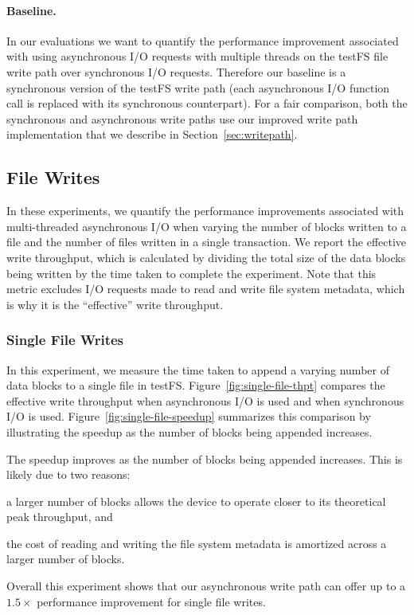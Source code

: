 \paragraph{Baseline.}
In our evaluations we want to quantify the performance improvement associated
with using asynchronous I/O requests with multiple threads on the testFS file
write path over synchronous I/O requests. Therefore our baseline is a
synchronous version of the testFS write path (each asynchronous I/O function
call is replaced with its synchronous counterpart). For a fair comparison, both
the synchronous and asynchronous write paths use our improved write path
implementation that we describe in Section~\ref{sec:writepath}.

\subsection{File Writes}
In these experiments, we quantify the performance improvements associated with
multi-threaded asynchronous I/O when varying the number of blocks written to a
file and the number of files written in a single transaction. We report the
effective write throughput, which is calculated by dividing the total size of
the data blocks being written by the time taken to complete the experiment.
Note that this metric excludes I/O requests made to read and write file system
metadata, which is why it is the ``effective'' write throughput.

\subsubsection{Single File Writes}
In this experiment, we measure the time taken to append a varying number of
data blocks to a single file in testFS. Figure~\ref{fig:single-file-thpt}
compares the effective write throughput when asynchronous I/O is used and when
synchronous I/O is used. Figure~\ref{fig:single-file-speedup} summarizes this
comparison by illustrating the speedup as the number of blocks being appended
increases.

The speedup improves as the number of blocks being appended increases. This is
likely due to two reasons:
\begin{enumerate*}[label={(\roman*)}]
  \item a larger number of blocks allows the device to operate closer to its
    theoretical peak throughput, and
  \item the cost of reading and writing the file system metadata is amortized
    across a larger number of blocks.
\end{enumerate*}
Overall this experiment shows that our asynchronous write path can offer up to
a $1.5\times$ performance improvement for single file writes.
